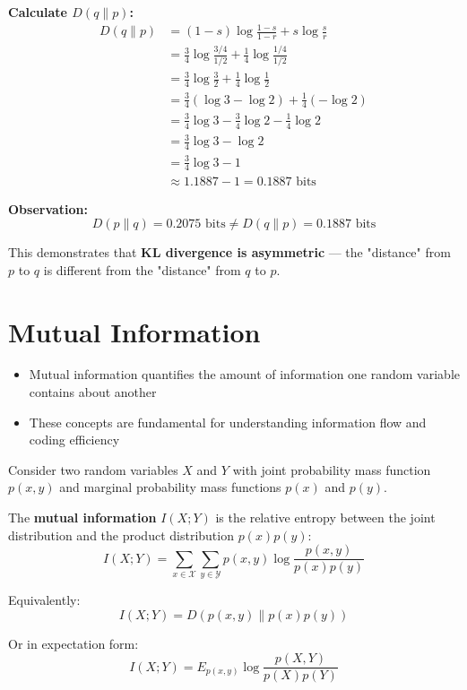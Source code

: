 \documentclass[11pt,a4paper]{book}
\newenvironment{definitionbox}[1][Definition]{
    \begin{tcolorbox}[
        enhanced,
        breakable,
        colback=primaryblue!10,
        colframe=primaryblue!150,
        title=#1,
        fonttitle=\bfseries,
        sharp corners,
        boxrule=0.8pt,
        left=8pt,
        right=8pt,
        top=6pt,
        bottom=6pt
    ]
}{
    \end{tcolorbox}
}
\newcounter{qna}[chapter]
\renewcommand{\theqna}{\thechapter.\arabic{qna}}
\newenvironment{questionanswerbox}{
    \refstepcounter{qna}%
    \begin{tcolorbox}[
        enhanced,
        breakable,
        colback=softlavender!10,
        colframe=softlavender!200,
        title={Example~\theqna}, %
        fonttitle=\bfseries,
        coltitle=white,
        colbacktitle=softlavender!200,
        sharp corners,
        boxrule=1pt,
        left=8pt,
        right=8pt,
        top=6pt,
        bottom=6pt
    ]
}{
    \end{tcolorbox}
}
\begin{document}
\begin{questionanswerbox}
    \textbf{Calculate \(D(q \| p)\):}
    \begin{align*}
    D(q \| p) &= (1-s) \log \frac{1-s}{1-r} + s \log \frac{s}{r} \\
    &= \frac{3}{4} \log \frac{3/4}{1/2} + \frac{1}{4} \log \frac{1/4}{1/2} \\
    &= \frac{3}{4} \log \frac{3}{2} + \frac{1}{4} \log \frac{1}{2} \\
    &= \frac{3}{4} (\log 3 - \log 2) + \frac{1}{4} (- \log 2) \\
    &= \frac{3}{4} \log 3 - \frac{3}{4} \log 2 - \frac{1}{4} \log 2 \\
    &= \frac{3}{4} \log 3 - \log 2 \\
    &= \frac{3}{4} \log 3 - 1 \\
    &\approx 1.1887 - 1 = 0.1887 \text{ bits}
    \end{align*}
    
    \textbf{Observation:}
    \[
    D(p \| q) = 0.2075 \text{ bits} \neq D(q \| p) = 0.1887 \text{ bits}
    \]
    
    This demonstrates that \textbf{KL divergence is asymmetric} — the "distance" from \(p\) to \(q\) is different from the "distance" from \(q\) to \(p\).
\end{questionanswerbox}

\section{Mutual Information}
\begin{itemize}
    \item Mutual information quantifies the amount of information one random variable contains about another
    \item These concepts are fundamental for understanding information flow and coding efficiency
\end{itemize}

\begin{definitionbox}[Mutual Information]
    Consider two random variables \(X\) and \(Y\) with joint probability mass function \(p(x,y)\) and marginal probability mass functions \(p(x)\) and \(p(y)\). 
    
    The \textbf{mutual information} \(I(X;Y)\) is the relative entropy between the joint distribution and the product distribution \(p(x)p(y)\):
    \[
    I(X;Y) = \sum_{x \in \mathcal{X}} \sum_{y \in \mathcal{Y}} p(x,y) \log \frac{p(x,y)}{p(x)p(y)}
    \]
    
    Equivalently:
    \[
    I(X;Y) = D(p(x,y) \| p(x)p(y))
    \]
    
    Or in expectation form:
    \[
    I(X;Y) = E_{p(x,y)} \log \frac{p(X,Y)}{p(X)p(Y)}
    \]
\end{definitionbox}
\end{document}
